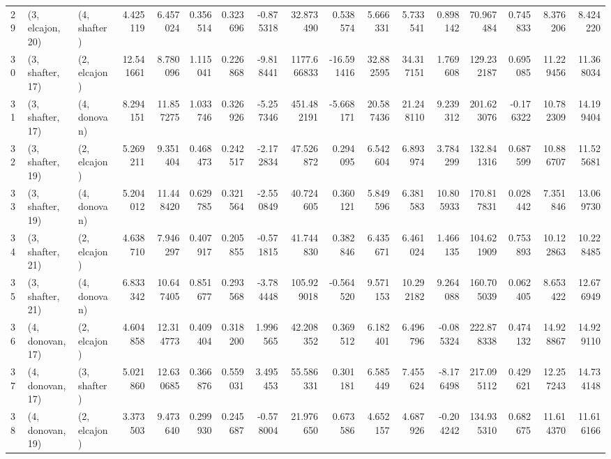 \begin{tabular}{lllrrrrrrrrrrrrrr}
29 &  (3, elcajon, 20) &     (4, shafter) &   4.425119 &   6.457024 &   0.356514 &  0.323696 & -0.875318 &    32.873490 &   0.538574 &   5.666331 &   5.733541 &   0.898142 &   70.967484 &  0.745833 &   8.376206 &   8.424220 \\
30 &  (3, shafter, 17) &     (2, elcajon) &  12.541661 &   8.780096 &   1.115041 &  0.226868 & -9.818441 &  1177.666833 & -16.591416 &  32.882595 &  34.317151 &   1.769608 &  129.232187 &  0.695085 &  11.229456 &  11.368034 \\
31 &  (3, shafter, 17) &     (4, donovan) &   8.294151 &  11.857275 &   1.033746 &  0.326926 & -5.257346 &   451.482191 &  -5.668171 &  20.587436 &  21.248110 &   9.239312 &  201.623076 & -0.176322 &  10.782309 &  14.199404 \\
32 &  (3, shafter, 19) &     (2, elcajon) &   5.269211 &   9.351404 &   0.468473 &  0.242517 & -2.172834 &    47.526872 &   0.294095 &   6.542604 &   6.893974 &   3.784299 &  132.841316 &  0.687599 &  10.886707 &  11.525681 \\
33 &  (3, shafter, 19) &     (4, donovan) &   5.204012 &  11.448420 &   0.629785 &  0.321564 & -2.550849 &    40.724605 &   0.360121 &   5.849596 &   6.381583 &  10.805933 &  170.817831 &  0.028442 &   7.351846 &  13.069730 \\
34 &  (3, shafter, 21) &     (2, elcajon) &   4.638710 &   7.946297 &   0.407917 &  0.205855 & -0.571815 &    41.744830 &   0.382846 &   6.435671 &   6.461024 &   1.466135 &  104.621909 &  0.753893 &  10.122863 &  10.228485 \\
35 &  (3, shafter, 21) &     (4, donovan) &   6.833342 &  10.647405 &   0.851677 &  0.293568 & -3.784448 &   105.929018 &  -0.564520 &   9.571153 &  10.292182 &   9.264088 &  160.705039 &  0.062405 &   8.653422 &  12.676949 \\
36 &  (4, donovan, 17) &     (2, elcajon) &   4.604858 &  12.314773 &   0.409404 &  0.318200 &  1.996565 &    42.208352 &   0.369512 &   6.182401 &   6.496796 &  -0.085324 &  222.878338 &  0.474132 &  14.928867 &  14.929110 \\
37 &  (4, donovan, 17) &     (3, shafter) &   5.021860 &  12.630685 &   0.366876 &  0.559031 &  3.495453 &    55.586331 &   0.301181 &   6.585449 &   7.455624 &  -8.176498 &  217.095112 &  0.429621 &  12.257243 &  14.734148 \\
38 &  (4, donovan, 19) &     (2, elcajon) &   3.373503 &   9.473640 &   0.299930 &  0.245687 & -0.578004 &    21.976650 &   0.673586 &   4.652157 &   4.687926 &  -0.204242 &  134.935310 &  0.682675 &  11.614370 &  11.616166 \\

\end{tabular}
